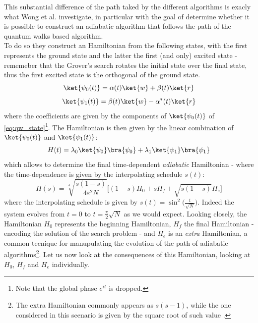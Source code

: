 \noindent
This substantial difference of the path taked by the different algorithms is exacly what Wong et al. investigate, in particular with the goal of determine whether it is possible to construct an adiabatic algorithm that follows the path of the quantum walks based algorithm. \\

\noindent
To do so they construct an Hamiltonian from the following states, with the first represents the ground state and the latter the first (and only) excited state - rememeber that the Grover's search rotates the initial state over the final state, thus the first excited state is the orthogonal of the ground state.
\begin{equation}
  \ket{\psi_0(t)} = \alpha(t)\ket{w} + \beta(t)\ket{r}
\end{equation}
\vspace{-0.5cm}
\begin{equation}
  \ket{\psi_1(t)} = \beta(t)\ket{w} - \alpha^*(t)\ket{r}
\end{equation}
where the coefficients are given by the components of $\ket{\psi_0(t)}$ of \cref{eq:qw_state}\footnote{Note that the global phase $e^{it}$ is dropped.}.
The Hamiltonian is then given by the linear combination of $\ket{\psi_0(t)}$ and $\ket{\psi_1(t)}$:
\begin{equation}
  H(t) = \lambda_0\ket{\psi_0}\bra{\psi_0} + \lambda_1\ket{\psi_1}\bra{\psi_1}
\end{equation}
which allows to determine the final time-dependent \textit{adiabatic} Hamiltonian - where the time-dependence is given by the interpolating schedule $s(t)$:
\begin{equation}
  H(s) = \sqrt[4]{\frac{s(1-s)}{4\varepsilon^2N}}\Big[ (1-s)H_0 + sH_f + \sqrt{s(1-s)}H_e\Big]
\end{equation}
where the interpolating schedule is given by $s(t)=\sin^2\big(\frac{t}{\sqrt{N}}\big)$. Indeed the system evolves from $t=0$ to $t=\frac{\pi}{2}\sqrt{N}$ as we would expect. Looking closely, the Hamiltonian $H_0$ represents the beginning Hamiltonian, $H_f$ the final Hamiltonian - encoding the solution of the search problem - and $H_e$ is an \textit{extra} Hamiltonian, a common tecnique for manupulating the evolution of the path of adiabatic algorithms\footnote{The extra Hamiltonian commonly appears as $s(s-1)$, while the one considered in this scenario is given by the square root of such value \cite{Wong2016}.}. Let us now look at the consequences of this Hamiltonian, looking at $H_0$, $H_f$ and $H_e$ individually. \\
